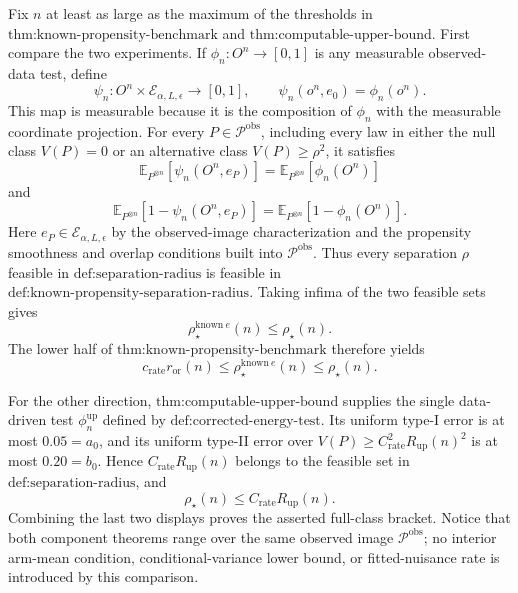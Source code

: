 Fix \(n\) at least as large as the maximum of the thresholds in \(\text{thm:known-propensity-benchmark}\) and \(\text{thm:computable-upper-bound}\).  First compare the two experiments.  If \(\phi_n:O^n\to[0,1]\) is any measurable observed-data test, define
\[
 \psi_n:O^n\times\mathcal E_{\alpha,L,\epsilon}\longrightarrow[0,1],
 \qquad
 \psi_n(o^n,e_0)=\phi_n(o^n).
\]
This map is measurable because it is the composition of \(\phi_n\) with the measurable coordinate projection.  For every \(P\in\mathcal P^{\mathrm{obs}}\), including every law in either the null class \(V(P)=0\) or an alternative class \(V(P)\ge\rho^2\), it satisfies
\[
 \mathbb E_{P^{\otimes n}}\!\left[\psi_n(O^n,e_P)\right]
 =\mathbb E_{P^{\otimes n}}\!\left[\phi_n(O^n)\right]
\]
and
\[
 \mathbb E_{P^{\otimes n}}\!\left[1-\psi_n(O^n,e_P)\right]
 =\mathbb E_{P^{\otimes n}}\!\left[1-\phi_n(O^n)\right].
\]
Here \(e_P\in\mathcal E_{\alpha,L,\epsilon}\) by the observed-image characterization and the propensity smoothness and overlap conditions built into \(\mathcal P^{\mathrm{obs}}\).  Thus every separation \(\rho\) feasible in \(\text{def:separation-radius}\) is feasible in \(\text{def:known-propensity-separation-radius}\).  Taking infima of the two feasible sets gives
\[
 \rho_\star^{\mathrm{known}\ e}(n)\le \rho_\star(n).
\]
The lower half of \(\text{thm:known-propensity-benchmark}\) therefore yields
\[
 c_{\mathrm{rate}}r_{\mathrm{or}}(n)
 \le \rho_\star^{\mathrm{known}\ e}(n)
 \le \rho_\star(n).
\]

For the other direction, \(\text{thm:computable-upper-bound}\) supplies the single data-driven test \(\phi_n^{\mathrm{up}}\) defined by \(\text{def:corrected-energy-test}\).  Its uniform type-I error is at most \(0.05=a_0\), and its uniform type-II error over \(V(P)\ge C_{\mathrm{rate}}^2R_{\mathrm{up}}(n)^2\) is at most \(0.20=b_0\).  Hence \(C_{\mathrm{rate}}R_{\mathrm{up}}(n)\) belongs to the feasible set in \(\text{def:separation-radius}\), and
\[
 \rho_\star(n)\le C_{\mathrm{rate}}R_{\mathrm{up}}(n).
\]
Combining the last two displays proves the asserted full-class bracket.  Notice that both component theorems range over the same observed image \(\mathcal P^{\mathrm{obs}}\); no interior arm-mean condition, conditional-variance lower bound, or fitted-nuisance rate is introduced by this comparison.

